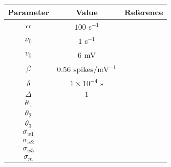 \documentclass[onecolumn,draftcls]{IEEEtran}
\begin{document}
\begin{tabular}{|c|c|c|}
\hline
Parameter & Value & Reference\\
\hline
$\alpha$ & $100$ s$^{-1}$ &\\
\hline
$\nu_0$ & $1$ s$^{-1}$ &\\
\hline
$v_0$ & $6$ mV &\\
\hline
$\beta$ & $0.56$ spikes/mV$^{-1}$ & \\
\hline
$\delta$ & $1\times10^{-4}$ s &\\
\hline
$\Delta$ & $1$ &\\
\hline
$\theta_1$ &  &\\
\hline
$\theta_2$ &  &\\
\hline
$\theta_3$ &  &\\
\hline
$\sigma_{w1}$ &  &\\
\hline
$\sigma_{w2}$ &  &\\
\hline
$\sigma_{w3}$ &  &\\
\hline
$\sigma_m$ &  &\\
\hline
\end{tabular}
\end{document}
